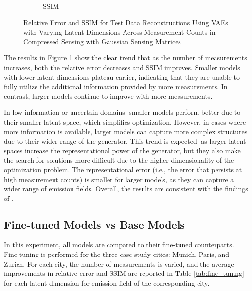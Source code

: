 \begin{figure}[h!]
\begin{subfigure}[b]{0.49\textwidth}
        \caption{SSIM}
    \end{subfigure}
    \caption{Relative Error and SSIM for Test Data Reconstructions Using VAEs with Varying Latent Dimensions Across Measurement Counts in Compressed Sensing with Gaussian Sensing Matrices}
    \label{fig:experiment_latent_dim}
\end{figure}

The results in Figure \ref{fig:experiment_latent_dim} show the clear trend that as the number of measurements increases, both the relative error decreases and \gls{SSIM} improves.
Smaller models with lower latent dimensions plateau earlier, indicating that they are unable to fully utilize the additional information provided by more measurements.
In contrast, larger models continue to improve with more measurements.

In low-information or uncertain domains, smaller models perform better due to their smaller latent space, which simplifies optimization.
However, in cases where more information is available, larger models can capture more complex structures due to their wider range of the generator.
This trend is expected, as larger latent spaces increase the representational power of the generator, but they also make the search for solutions more difficult due to the higher dimensionality of the optimization problem.
The representational error (i.e., the error that persists at high measurement counts) is smaller for larger models, as they can capture a wider range of emission fields.
Overall, the results are consistent with the findings of \textcite{CSUsingAI}.

\subsection{Fine-tuned Models vs Base Models}
In this experiment, all models are compared to their fine-tuned counterparts.
Fine-tuning is performed for the three case study cities: Munich, Paris, and Zurich.
For each city, the number of measurements is varied, and the average improvements in relative error and \gls{SSIM} are reported in Table \ref{tab:fine_tuning} for each latent dimension for emission field of the corresponding city.

